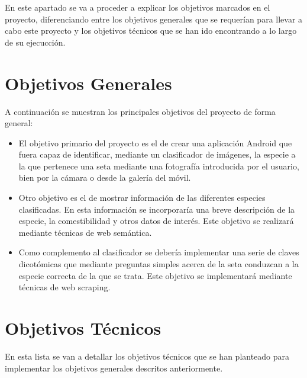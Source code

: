 En este apartado se va a proceder a explicar los objetivos marcados en el proyecto, diferenciando entre los objetivos generales que se requerían para llevar a cabo este proyecto y los objetivos técnicos que se han ido encontrando a lo largo de su ejecucción.

\section{Objetivos Generales}

A continuación se muestran los principales objetivos del proyecto de forma general:

\begin{itemize}
	\item El objetivo primario del proyecto es el de crear una aplicación Android que fuera capaz de identificar, mediante un clasificador de imágenes, la especie a la que pertenece una seta mediante una fotografía introducida por el usuario, bien por la cámara o desde la galería del móvil.
	\item Otro objetivo es el de mostrar información de las diferentes especies clasificadas. En esta información se incorporaría una breve descripción de la especie, la comestibilidad y otros datos de interés. Este objetivo se realizará mediante técnicas de web semántica.
	\item Como complemento al clasificador se debería implementar una serie de claves dicotómicas que mediante preguntas simples acerca de la seta conduzcan a la especie correcta de la que se trata. Este objetivo se implementará mediante técnicas de web scraping.
\end{itemize}

\section{Objetivos Técnicos}

En esta lista se van a detallar los objetivos técnicos que se han planteado para implementar los objetivos generales descritos anteriormente.

